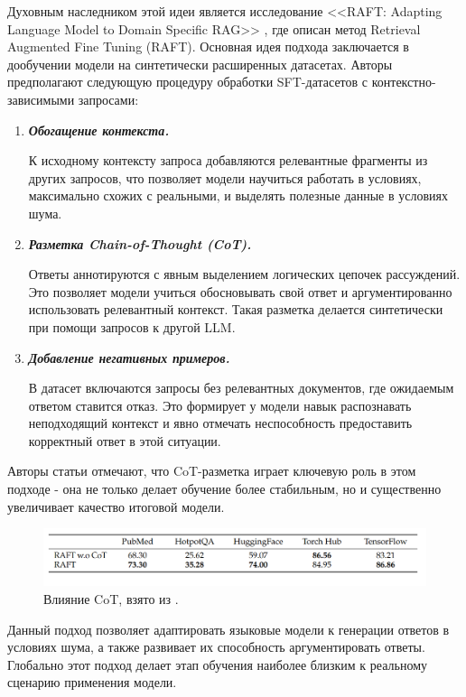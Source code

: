 Духовным наследником этой идеи является исследование <<RAFT: Adapting Language Model to Domain Specific RAG>> \cite{raft}, где описан метод Retrieval Augmented
Fine Tuning (RAFT). Основная идея подхода заключается в дообучении модели на синтетически расширенных датасетах. Авторы предполагают следующую процедуру обработки SFT-датасетов с контекстно-зависимыми запросами:
\begin{enumerate}

  \item \textbf{\textit{Обогащение контекста.}}
  
  К исходному контексту запроса добавляются релевантные фрагменты из других запросов, что позволяет модели научиться работать в условиях, максимально схожих с реальными, и выделять полезные данные в условиях шума.
  
 \item \textit{\textbf{Разметка Chain-of-Thought (CoT).}}
  
  Ответы аннотируются с явным выделением логических цепочек рассуждений. Это позволяет модели учиться обосновывать свой ответ и аргументированно использовать релевантный контекст. Такая разметка делается синтетически при помощи запросов к другой LLM.
  
  \item \textit{\textbf{Добавление негативных примеров.}}
  
  В датасет включаются запросы без релевантных документов, где ожидаемым ответом ставится отказ. Это формирует у модели навык распознавать неподходящий контекст и явно отмечать неспособность предоставить корректный ответ в этой ситуации.
  
\end{enumerate}

Авторы статьи отмечают, что CoT-разметка играет ключевую роль в этом подходе - она не только делает обучение более стабильным, но и существенно увеличивает качество итоговой модели.

\begin{figure}[h!]
    \centering
    \includegraphics[scale=0.4]{images/raft_cot.png}
    \caption{Влияние CoT, взято из \cite{raft}.}
\end{figure}

Данный подход позволяет адаптировать языковые модели к генерации ответов в условиях шума, а также развивает их способность аргументировать ответы. Глобально этот подход делает этап обучения наиболее близким к реальному сценарию применения модели.

